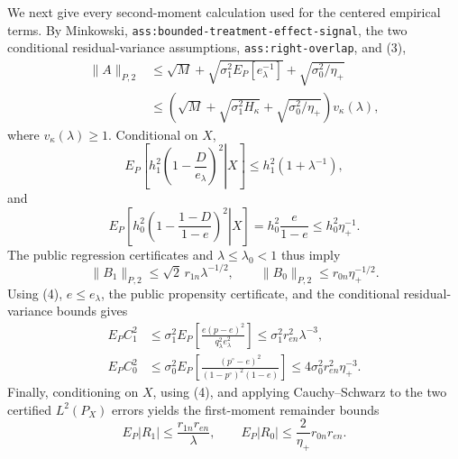 We next give every second-moment calculation used for the centered empirical
terms.  By Minkowski, \texttt{ass:bounded-treatment-effect-signal}, the two
conditional residual-variance assumptions, \texttt{ass:right-overlap}, and
(3),
\[
\begin{split}
\|A\|_{P,2}
&\leq\sqrt M
+\sqrt{\sigma_1^2E_P[e_\lambda^{-1}]}
+\sqrt{\sigma_0^2/\eta_+}\\
&\leq
\left(\sqrt M+\sqrt{\sigma_1^2H_\kappa}
+\sqrt{\sigma_0^2/\eta_+}\right)v_\kappa(\lambda),
\end{split} \tag{8}
\]
where \(v_\kappa(\lambda)\geq1\).  Conditional on \(X\),
\[
E_P\!\left[\left.h_1^2\left(1-\frac D{e_\lambda}\right)^2
\right|X\right]
\leq h_1^2(1+\lambda^{-1}),
\]
and
\[
E_P\!\left[\left.h_0^2\left(1-\frac{1-D}{1-e}\right)^2
\right|X\right]
=h_0^2\frac e{1-e}\leq h_0^2\eta_+^{-1}.
\]
The public regression certificates and \(\lambda\leq\lambda_0<1\) thus imply
\[
\|B_1\|_{P,2}\leq\sqrt2\,r_{1n}\lambda^{-1/2},
\qquad
\|B_0\|_{P,2}\leq r_{0n}\eta_+^{-1/2}.                            \tag{9}
\]
Using (4), \(e\leq e_\lambda\), the public propensity certificate, and the
conditional residual-variance bounds gives
\[
\begin{split}
E_PC_1^2
&\leq\sigma_1^2E_P\!\left[
\frac{e(p-e)^2}{q_\lambda^2e_\lambda^2}\right]
\leq\sigma_1^2r_{en}^2\lambda^{-3},\\
E_PC_0^2
&\leq\sigma_0^2E_P\!\left[
\frac{(p^\circ-e)^2}{(1-p^\circ)^2(1-e)}\right]
\leq4\sigma_0^2r_{en}^2\eta_+^{-3}.
\end{split} \tag{10}
\]
Finally, conditioning on \(X\), using (4), and applying Cauchy--Schwarz to the
two certified \(L^2(P_X)\) errors yields the first-moment remainder bounds
\[
E_P|R_1|\leq\frac{r_{1n}r_{en}}\lambda,
\qquad
E_P|R_0|\leq\frac2{\eta_+}r_{0n}r_{en}.                             \tag{11}
\]

